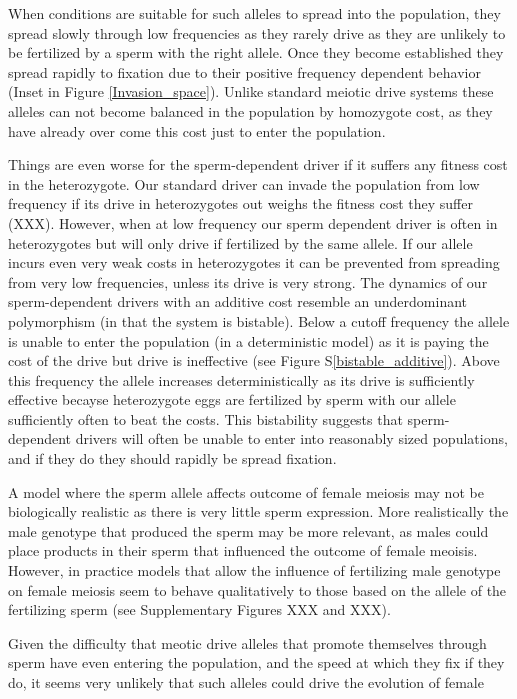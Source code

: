 \documentclass[12pt,letterpaper]{article}
\begin{document}
When conditions are suitable for such alleles to spread into the
population, they spread slowly through low frequencies as they rarely
drive as they are unlikely to be fertilized by a sperm with the right
allele. Once they become established they spread rapidly to fixation due to their
positive frequency dependent behavior (Inset in Figure \ref{Invasion_space}). 
Unlike standard meiotic drive systems 
these alleles can not become balanced in the population  by homozygote
cost, as they have already over come this cost just to enter the population.

Things are even worse for the sperm-dependent driver if it suffers any
fitness cost in the heterozygote. Our standard driver can invade the
population from low frequency if its drive in heterozygotes out weighs
the fitness cost they suffer (XXX). However, when at low frequency our
sperm dependent driver is often in heterozygotes but will only drive
if fertilized by the same allele. If our allele incurs even very weak costs
in heterozygotes it can be prevented from spreading from very low
frequencies, unless its drive is very strong. The dynamics of 
our sperm-dependent drivers with an additive cost resemble an underdominant polymorphism
(in that the system is bistable). Below a cutoff frequency the allele is
unable to enter the population (in a deterministic model) as it is
paying the cost of the drive but drive is ineffective (see Figure
S\ref{bistable_additive}). Above this
frequency the allele increases deterministically as its drive is sufficiently effective 
becayse heterozygote eggs are fertilized by sperm with our allele
sufficiently often to beat the costs. 
This bistability suggests that sperm-dependent drivers will often be 
unable to enter into reasonably sized populations, and if they do they
should rapidly be spread fixation.

A model where the sperm allele affects outcome of female meiosis may not be biologically
realistic as there is very little sperm expression. More realistically the male genotype that produced the sperm
may be more relevant, as males could place products in their sperm that influenced the outcome of female meoisis.
However, in practice models that allow the influence of fertilizing male genotype on female meiosis 
seem to behave qualitatively to those based on the allele of the
fertilizing sperm (see Supplementary Figures XXX and XXX).

Given the difficulty that meotic drive alleles that promote themselves
through sperm have even entering the population, and the speed at
which they fix if they do, it seems very unlikely that such alleles
could drive the evolution of female 
\end{document}
